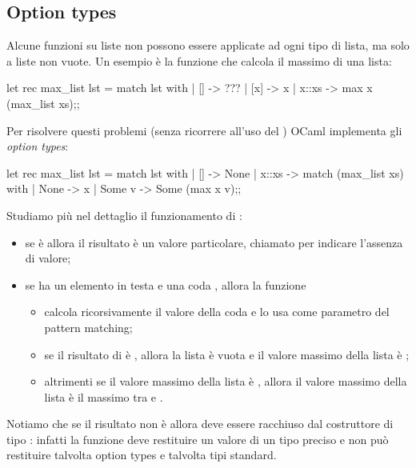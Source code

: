 \subsection*{Option types}
Alcune funzioni su liste non possono essere applicate ad ogni tipo di lista, ma solo a liste non vuote. Un esempio è la funzione che calcola il massimo di una lista:
\begin{OCaml}
    let rec max_list lst = 
        match lst with
        | []    -> ???
        | [x]   -> x
        | x::xs -> max x (max_list xs);; 
\end{OCaml}
Per risolvere questi problemi (senza ricorrere all'uso del ) OCaml implementa gli \emph{option types}:
\begin{OCaml}
    let rec max_list lst = 
        match lst with
        | [] -> None
        | x::xs -> match (max_list xs) with
                    | None   -> x
                    | Some v -> Some (max x v);;
\end{OCaml}
Studiamo più nel dettaglio il funzionamento di : \begin{itemize}
    \item se  è \InlineOCaml{[]} allora il risultato è un valore particolare, chiamato  per indicare l'assenza di valore;
    \item se  ha un elemento in testa  e una coda , allora la funzione
    \begin{itemize}
        \item calcola ricorsivamente il valore della coda e lo usa come parametro del pattern matching;
        \item se il risultato di  è , allora la lista  è vuota e il valore massimo della lista  è ;
        \item altrimenti se il valore massimo della lista  è , allora il valore massimo della lista  è il massimo tra  e .
    \end{itemize}
\end{itemize}
Notiamo che se il risultato non è  allora deve essere racchiuso dal costruttore di tipo : infatti la funzione deve restituire un valore di un tipo preciso e non può restituire talvolta option types e talvolta tipi standard.

